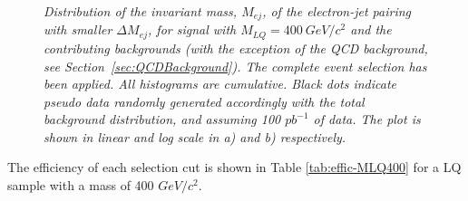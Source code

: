 \documentclass{cmspaper}
\begin{document}
\begin{linenumbers}
\begin{figure}[htbp]
\begin{center}
\begin{tabular}{cc}
    \end{tabular}
    \caption{\small \sl Distribution of the invariant mass, $M_{ej}$, 
      of the electron-jet pairing with smaller $\Delta M_{ej}$, for signal with $M_{LQ}=400~$$GeV/c^2$ and the contributing backgrounds 
      (with the exception of the QCD background, see Section~\ref{sec:QCDBackground}). 
      The complete event selection has been applied.
      All histograms are cumulative.
      Black dots indicate pseudo data randomly generated accordingly with 
      the total background distribution, and assuming 100 $pb^{-1}$ of data.
      The plot is shown in linear and log scale in a) and b) respectively. 
      }
    \label{fig:Mej_allComb}
  \end{center}
\end{figure}


The efficiency of each selection cut is shown in Table \ref{tab:effic-MLQ400} 
for a LQ sample with a mass of 400 $GeV/c^2$. 



\end{linenumbers}
\end{document}
